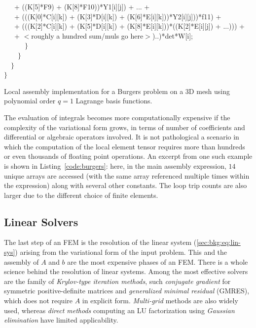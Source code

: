 \begin{algorithm}[H]
~~~+ ((K[5]*F9) + (K[8]*F10))*Y1[i][j]) + ... + \\
~~~+ (((K[0]*C[i][k]) + (K[3]*D[i][k]) + (K[6]*E[i][k]))*Y2[i][j]))*f11) + \\
~~~+ (((K[2]*C[i][k]) + (K[5]*D[i][k]) + (K[8]*E[i][k]))*((K[2]*E[i][j]) + ...))) + \\
~~~+ $<$roughly a hundred sum/muls go here$>$)..)*det*W[i];\\
~~~~~~$\rbrace$\\
~~~~$\rbrace$\\
~~$\rbrace$ \\
$\rbrace$
\caption{Local assembly implementation for a Burgers problem on a 3D mesh using polynomial order $q=1$ Lagrange basis functions.}
\label{code:burgers}
\end{algorithm}

The evaluation of integrals becomes more computationally expensive if the complexity of the variational form grows, in terms of number of coefficients and differential or algebraic operators involved. It is not pathological a scenario in which the computation of the local element tensor requires more than hundreds or even thousands of floating point operations. An excerpt from one such example is shown in Listing~\ref{code:burgers}: here, in the main assembly expression, $14$ unique arrays are accessed (with the same array referenced multiple times within the expression) along with several other constants. The loop trip counts are also larger due to the different choice of finite elements. 

%
%


\subsection{Linear Solvers}
\label{sec:bkg:linearsolvers}
The last step of an FEM is the resolution of the linear system (\ref{sec:bkg:eq:lin-sys}) arising from the variational form of the input problem. This and the assembly of $A$ and $b$ are the most expensive phases of an FEM. There is a whole science behind the resolution of linear systems. Among the most effective solvers are the family of {\em Krylov-type iteration methods}, such {\em conjugate gradient} for symmetric positive-definite matrices and {\em generalized minimal residual} (GMRES), which does not require $A$ in explicit form. {\em Multi-grid} methods are also widely used, whereas {\em direct methods} computing an LU factorization using {\em Gaussian elimination} have limited applicability. 

